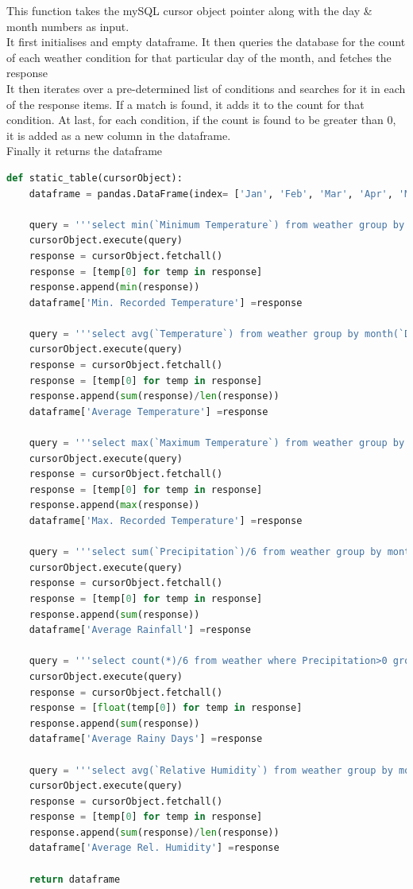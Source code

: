\documentclass[12pt, a4paper]{article}
\begin{document}
This function takes the mySQL cursor object pointer along with the day \& month numbers as input.\\

It first initialises and empty dataframe. It then queries the database for the count of each weather condition for that particular day of the month, and fetches the response\\

It then iterates over a pre-determined list of conditions and searches for it in each of the response items. If a match is found, it adds it to the count for that condition. At last, for each condition, if the count is found to be greater than 0, it is added as a new column in the dataframe.\\

Finally it returns the dataframe
\newpage
\begin{lstlisting}[language=Python, breaklines=true]
def static_table(cursorObject):
    dataframe = pandas.DataFrame(index= ['Jan', 'Feb', 'Mar', 'Apr', 'May', 'Jun', 'Jul', 'Aug', 'Sep', 'Oct', 'Nov', 'Dec', 'Year'])

    query = '''select min(`Minimum Temperature`) from weather group by month(`Date Time`);'''
    cursorObject.execute(query)
    response = cursorObject.fetchall()
    response = [temp[0] for temp in response]
    response.append(min(response))
    dataframe['Min. Recorded Temperature'] =response

    query = '''select avg(`Temperature`) from weather group by month(`Date Time`);'''
    cursorObject.execute(query)
    response = cursorObject.fetchall()
    response = [temp[0] for temp in response]
    response.append(sum(response)/len(response))
    dataframe['Average Temperature'] =response

    query = '''select max(`Maximum Temperature`) from weather group by month(`Date Time`);'''
    cursorObject.execute(query)
    response = cursorObject.fetchall()
    response = [temp[0] for temp in response]
    response.append(max(response))
    dataframe['Max. Recorded Temperature'] =response

    query = '''select sum(`Precipitation`)/6 from weather group by month(`Date Time`);'''
    cursorObject.execute(query)
    response = cursorObject.fetchall()
    response = [temp[0] for temp in response]
    response.append(sum(response))
    dataframe['Average Rainfall'] =response

    query = '''select count(*)/6 from weather where Precipitation>0 group by Month(`Date time`);'''
    cursorObject.execute(query)
    response = cursorObject.fetchall()
    response = [float(temp[0]) for temp in response]
    response.append(sum(response))
    dataframe['Average Rainy Days'] =response

    query = '''select avg(`Relative Humidity`) from weather group by month(`Date Time`);'''
    cursorObject.execute(query)
    response = cursorObject.fetchall()
    response = [temp[0] for temp in response]
    response.append(sum(response)/len(response))
    dataframe['Average Rel. Humidity'] =response

    return dataframe
\end{lstlisting}
\end{document}
